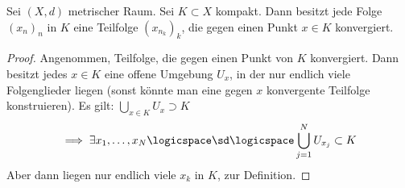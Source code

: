 \begin{satz}\label{bolzanoweierstrass}
    Sei \( (X,d) \) metrischer Raum. Sei \( K\subset X \) kompakt. Dann besitzt jede Folge \( (x_n)_n \) in \( K \) eine Teilfolge \( (x_{n_k})_k \), die gegen einen Punkt \( x\in K \) konvergiert. 
\end{satz}
\begin{proof}
    Angenommen, \tnexists Teilfolge, die gegen einen Punkt von \( K \) konvergiert. Dann besitzt jedes \( x\in K \) eine offene Umgebung \( U_x \), in der nur endlich viele Folgenglieder liegen (sonst könnte man eine gegen \( x \) konvergente Teilfolge konstruieren). Es gilt: \( \bigcup_{x\in K}U_x\supset K \)
    \begin{align*}
        \implies \exists x_1,\ldots, x_N\logicspace\text{\sd} \logicspace \bigcup_{j=1}^{N}U_{x_j}\subset K   
    \end{align*}
    Aber dann liegen nur endlich viele \( x_k \) in \( K \), \contra zur Definition.
    
\end{proof}



